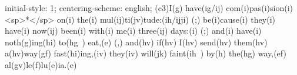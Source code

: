 initial-style: 1;
centering-scheme: english;
(c3)I(g) have(ig/ij) com(i)pas(i)sion(i) <sp>*</sp> on(i) the(i) mul(ij)ti(jv)tude:(ih/ijji) (;) be(i)cause(i) they(i) have(i) now(ij) been(i) with(i) me(i) three(ij) days:(i) (;) and(i) have(i) noth(g)ing(hi) to(hg~) eat,(e) (,) and(hv) if(hv) I(hv) send(hv) them(hv) a(hv)way(gf) fast(hi)ing,(iv) they(iv) will(jk) faint(ih~) by(h) the(hg) way,(ef) al(gv)le(f)lu(e)ia.(e)
